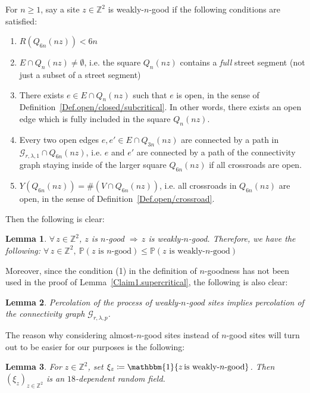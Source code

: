 \documentclass[10pt,a4paper]{amsart}
\theoremstyle{exampstyle}
\newtheorem{Lemma}{Lemma}
\theoremstyle{exampnotations}
\begin{document}
For $n \geq 1$, say a site $z \in \mathbb{Z}^{2}$ is weakly-$n$-good if the following conditions are satisfied:
\begin{enumerate}
\item[$\widetilde{(1)}$] $R(Q_{6n}(nz)) < 6n$
\item[(2)]  $E \cap Q_n(nz) \neq \emptyset$, i.e. the square $Q_n(nz)$ contains a \emph{full} street segment (not just a subset of a street segment)
\item[(3)]  There exists $e \in E \cap Q_n(nz)$ such that $e$ is open, in the sense of Definition~\ref{Def.open/closed/subcritical}. In other words, there exists an open edge which is fully included in the square $Q_n(nz)$.
\item[(4)]  Every two open edges $e,e' \in E \cap Q_{3n}(nz)$ are connected by a path in $\mathcal{G}_{r,\lambda,1}\cap Q_{6n}(nz)$, i.e. $e$ and $e'$ are connected by a path of the connectivity graph staying inside of the larger square $Q_{6n}(nz)$ if all crossroads are open.
\item[(5)]  $Y(Q_{6n}(nz)) = \#(V \cap Q_{6n}(nz))$, i.e. all crossroads in $Q_{6n}(nz)$ are open, in the sense of Definition~\ref{Def.open/crossroad}.
\end{enumerate}
Then the following is clear:
\begin{Lemma}
\label{Lemma1.almost}
$\forall \, z \in \mathbb{Z}^{2}$, $z$ is $n$-good $\Rightarrow \, z$ is weakly-$n$-good. Therefore, we have the following: $\forall \, z \in \mathbb{Z}^{2}, \: \mathbb{P}(\text{$z$ is $n$-good}) \leq \mathbb{P}(\text{$z$ is weakly-$n$-good})$
\end{Lemma} Moreover, since the condition (1) in the definition of $n$-goodness has not been used in the proof of Lemma~\ref{Claim1.supercritical}, the following is also clear:
\begin{Lemma}
\label{Lemma2.almost}
Percolation of the process of weakly-$n$-good sites implies percolation of the connectivity graph $\mathcal{G}_{r,\lambda,p}$.
\end{Lemma}
The reason why considering almost-$n$-good sites instead of $n$-good sites will turn out to be easier for our purposes is the following:
\begin{Lemma}
\label{Claim2.supercritical}
For $z \in \mathbb{Z}^{2}$, set $\xi_{z} \coloneqq \mathbbm{1}\lbrace z \, \text{is weakly-$n$-good} \rbrace$. Then $(\xi_{z})_{z \in \mathbb{Z}^{2}}$ is an $18$-dependent random field.
\end{Lemma}
\end{document}
